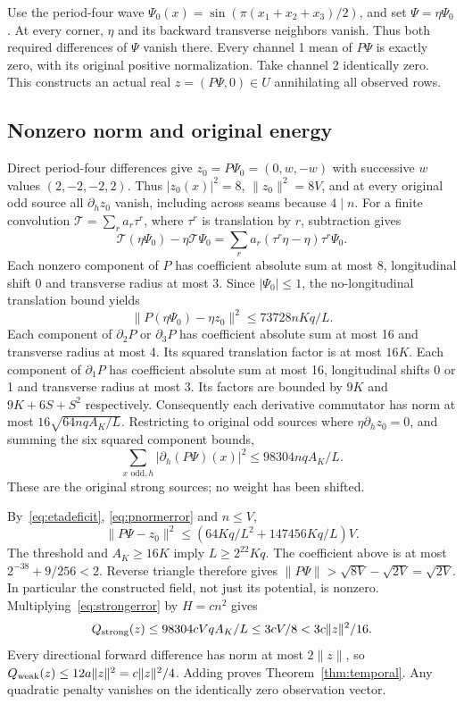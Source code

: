 \documentclass[11pt,a4paper]{article}
\newcommand{\norm}[1]{\lVert#1\rVert}
\begin{document}
Use the period-four wave
$\Psi_0(x)=\sin(\pi(x_1+x_2+x_3)/2)$, and set
$\Psi=\eta\Psi_0$. At every corner, $\eta$ and its backward transverse
neighbors vanish. Thus both required differences of $\Psi$ vanish there.
Every channel 1 mean of $P\Psi$ is exactly zero, with its original positive
normalization. Take channel 2 identically zero. This constructs an actual
real $z=(P\Psi,0)\in U$ annihilating all observed rows.

\subsection{Nonzero norm and original energy}
Direct period-four differences give $z_0=P\Psi_0=(0,w,-w)$ with successive
$w$ values $(2,-2,-2,2)$. Thus $|z_0(x)|^2=8$,
$\norm{z_0}^2=8V$, and at every original odd source all $\partial_hz_0$
vanish, including across seams because $4\mid n$.
For a finite convolution $\mathcal T=\sum_r a_r\tau^r$, where $\tau^r$
is translation by $r$, subtraction gives
\[
 \mathcal T(\eta\Psi_0)-\eta\mathcal T\Psi_0
 =\sum_r a_r(\tau^r\eta-\eta)\tau^r\Psi_0.
\]
Each nonzero component of $P$ has coefficient absolute sum at most 8,
longitudinal shift 0 and transverse radius at most 3. Since $|\Psi_0|\leq1$,
the no-longitudinal translation bound yields
\begin{equation}\label{eq:pnormerror}
 \norm{P(\eta\Psi_0)-\eta z_0}^2\leq73728nKq/L.
\end{equation}
Each component of $\partial_2P$ or $\partial_3P$ has coefficient absolute
sum at most 16 and transverse radius at most 4. Its squared translation
factor is at most $16K$. Each component of $\partial_1P$ has coefficient
absolute sum at most 16, longitudinal shifts 0 or 1 and transverse radius
at most 3. Its factors are bounded by $9K$ and $9K+6S+S^2$ respectively.
Consequently each derivative commutator has norm at most
$16\sqrt{64nqA_K/L}$. Restricting to original odd sources where
$\eta\partial_hz_0=0$, and summing the six squared component bounds,
\begin{equation}\label{eq:strongerror}
 \sum_{x\text{ odd},h}|\partial_h(P\Psi)(x)|^2
 \leq98304nqA_K/L.
\end{equation}
These are the original strong sources; no weight has been shifted.

By~\eqref{eq:etadeficit}, \eqref{eq:pnormerror} and $n\leq V$,
\[
 \norm{P\Psi-z_0}^2\leq
 \left(64Kq/L^2+147456Kq/L\right)V.
\]
The threshold and $A_K\geq16K$ imply $L\geq2^{22}Kq$. The coefficient
above is at most $2^{-38}+9/256<2$. Reverse triangle therefore gives
$\norm{P\Psi}>\sqrt{8V}-\sqrt{2V}=\sqrt{2V}$.
In particular the constructed field, not just its potential, is nonzero.
Multiplying~\eqref{eq:strongerror} by $H=cn^2$ gives
\[
 Q_{\rm strong}(z)\leq98304cVqA_K/L
 \leq3cV/8<3c\norm z^2/16.
\]
Every directional forward difference has norm at most $2\norm z$, so
$Q_{\rm weak}(z)\leq12a\norm z^2=c\norm z^2/4$.
Adding proves Theorem~\ref{thm:temporal}. Any quadratic penalty vanishes
on the identically zero observation vector.
\end{document}
